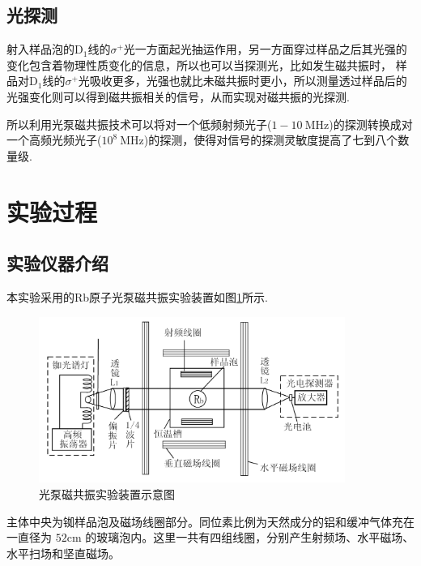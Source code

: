 \documentclass[10pt,hyperref,a4paper,UTF8]{ctexart}
\begin{document}
        \subsection{光探测}
                射入样品泡的$\mathrm{D}_{1}$线的$\sigma^{+}$光一方面起光抽运作用，另一方面穿过样品之后其光强的变化包含着物理性质变化的信息，所以也可以当探测光，比如发生磁共振时，
                样品对$\mathrm{D}_{1}$线的$\sigma^{+}$光吸收更多，光强也就比未磁共振时更小，所以测量透过样品后的光强变化则可以得到磁共振相关的信号，从而实现对磁共振的光探测. 

                所以利用光泵磁共振技术可以将对一个低频射频光子($1-10\ \mathrm{MHz}$)的探测转换成对一个高频光频光子($10^{8}\ \mathrm{MHz}$)的探测，使得对信号的探测灵敏度提高了七到八个数量级.

\section{实验过程}
        \subsection{实验仪器介绍}
                本实验采用的Rb原子光泵磁共振实验装置如图\ref{fig:实验装置}所示. 
                \begin{figure}[htbp]\label{fig:实验装置}
                        \centering
                        \includegraphics[width=10cm]{figures/syzz.jpg}
                        \caption{光泵磁共振实验装置示意图\cite{2007近代物理实验}}
                \end{figure}

                主体中央为铷样品泡及磁场线圈部分。同位素比例为天然成分的铝和缓冲气体充在一直径为 $52 \unit{\centi\meter}$ 的玻璃泡内。这里一共有四组线圈，分别产生射频场、水平磁场、水平扫场和坚直磁场。
\end{document}
